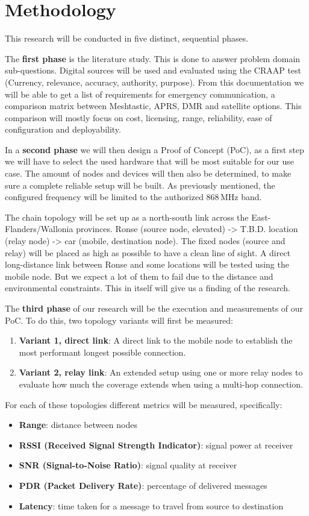 \section{Methodology}%
\label{sec:methodology}
This research will be conducted in five distinct, sequential phases.


The \textbf{first phase} is the literature study. This is done to answer problem domain sub-questions.
Digital sources will be used and evaluated using the CRAAP test (Currency, relevance, accuracy, authority, purpose).
From this documentation we will be able to get a list of requirements for emergency communication, a comparison matrix between Meshtastic, APRS, DMR and satellite options.
This comparison will mostly focus on cost, licensing, range, reliability, ease of configuration and deployability.


In a \textbf{second phase} we will then design a Proof of Concept (PoC), as a first step we will have to select the used hardware that will be most suitable for our use case.
The amount of nodes and devices will then also be determined, to make sure a complete reliable setup will be built.
As previously mentioned, the configured frequency will be limited to the authorized 868\,MHz band.

The chain topology will be set up as a north-south link across the East-Flanders/Wallonia provinces.
Ronse (source node, elevated) -> T.B.D. location (relay node) -> car (mobile, destination node).
The fixed nodes (source and relay) will be placed as high as possible to have a clean line of sight.
A direct long-distance link between Ronse and some locations will be tested using the mobile node.
But we expect a lot of them to fail due to the distance and environmental constraints.
This in itself will give us a finding of the research.


The \textbf{third phase} of our research will be the execution and measurements of our PoC.
To do this, two topology variants will first be measured:
\begin{enumerate}
\item \textbf{Variant 1, direct link}: A direct link to the mobile node to establish the most performant longest possible connection.
\item \textbf{Variant 2, relay link}: An extended setup using one or more relay nodes to evaluate how much the coverage extends when using a multi-hop connection.
\end{enumerate}
For each of these topologies different metrics will be measured, specifically:
\begin{itemize}
  \item \textbf{Range}: distance between nodes  
  \item \textbf{RSSI (Received Signal Strength Indicator)}: signal power at receiver
  \item \textbf{SNR (Signal-to-Noise Ratio)}: signal quality at receiver
  \item \textbf{PDR (Packet Delivery Rate)}: percentage of delivered messages
  \item \textbf{Latency}: time taken for a message to travel from source to destination
\end{itemize}

